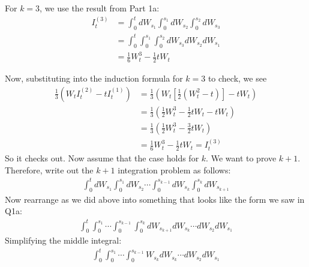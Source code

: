 \documentclass[12pt]{article}
\theoremstyle{plain}
\theoremstyle{definition}
\theoremstyle{remark}
\begin{document}
\begin{enumerate}
\begin{enumerate}
        For $k=3$, we use the result from Part 1a:
        \begin{align*}
          I^{(3)}_t
          &= \int^t_0 dW_{s_1} \int^{s_1}_0 dW_{s_2} \int^{s_2}_0 dW_{s_3}\\
          &=\int^t_0\int^{s_1}_0\int^{s_2}_0 dW_{s_3} dW_{s_2} dW_{s_1} \\
          &= \frac{1}{6} W_t^3 - \frac{1}{2} tW_t
        \end{align*}

        Now, substituting into the induction formula for $k=3$ to check,
        we see
        \begin{align*}
          \frac{1}{3}\left(W_t I^{(2)}_t - tI^{(1)}_t\right)
          &=
          \frac{1}{3}\left(W_t \left[ \frac{1}{2}(W_t^2 - t)\right]
              - tW_t\right)\\
          &=
          \frac{1}{3}\left( \frac{1}{2}W_t^3 - \frac{1}{2}tW_t
              - tW_t\right)\\
          &=
          \frac{1}{3}\left( \frac{1}{2}W_t^3 - \frac{3}{2}tW_t\right)\\
          &=
          \frac{1}{6}W_t^3 - \frac{1}{2}tW_t
          = I^{(3)}_t
        \end{align*}
        So it checks out. Now assume that the case holds for $k$. We
        want to prove $k+1$. Therefore, write out the $k+1$ integration
        problem as follows:
        \begin{align*}
          \int^t_0 dW_{s_1} \int^{s_1}_0 dW_{s_2}
          \cdots \int^{s_{k-1}}_0 dW_{s_{k}}
          \int^{s_k}_0 dW_{s_{k+1}}
        \end{align*}
        Now rearrange as we did above into something that looks like the
        form we saw in Q1a:
        \begin{align*}
          \int^t_0 \int^{s_1}_0 \cdots \int^{s_{k-1}}_0
          \int^{s_k}_0 dW_{s_{k+1}} dW_{s_{k}}\cdots
          dW_{s_2}dW_{s_1}
        \end{align*}
        Simplifying the middle integral:
        \begin{align*}
          \int^t_0 \int^{s_1}_0 \cdots \int^{s_{k-1}}_0
          W_{s_{k}}dW_{s_{k}}\cdots
          dW_{s_2}dW_{s_1}
        \end{align*}






    \end{enumerate}


\end{enumerate}
\end{document}
